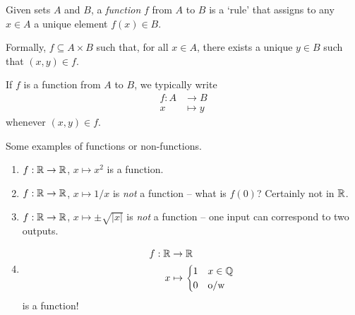 \documentclass{../../template/note}
\begin{document}
    \begin{definition}
        Given sets \(A\) and \(B\), a \emph{function} \(f\) from \(A\) to \(B\) is a `rule' that assigns to any \(x \in A\) a unique element \(f(x) \in B\).
        
        Formally, \(f \subseteq A \times B\) such that, for all \(x \in A\), there exists a unique \(y \in B\) such that \((x, y) \in f\).

        If \(f\) is a function from \(A\) to \(B\), we typically write
        \begin{align*}
            f: A &\to B \\
            x &\mapsto y
        \end{align*}
        whenever \((x, y) \in f\).
        
    \end{definition}
    
    \begin{example}
        Some examples of functions or non-functions.
        \begin{enumerate}[label=\protect\circled{\arabic*}]
            \item \(f: \mathbb R \to \mathbb R\), \(x \mapsto x^2\) is a function.
            \item \(f: \mathbb R \to \mathbb R\), \(x \mapsto 1/x\) is \emph{not} a function -- what is \(f(0)\)? Certainly not in \(\mathbb R\).
            \item \(f: \mathbb R \to \mathbb R\), \(x \mapsto \pm \sqrt{|x|}\) is \emph{not} a function -- one input can correspond to two outputs.
            \item \begin{align*}
                f: \mathbb R &\to \mathbb R \\
                x &\mapsto \begin{cases}
                    1 & x \in \mathbb Q \\
                    0 & \text{o/w}
                \end{cases}
            \end{align*}
            is a function!
        \end{enumerate}
    \end{example}

    
\end{document}
